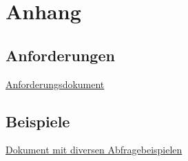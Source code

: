 \chapter*{Anhang}
\label{chap:anhang}


\appendix

\section*{Anforderungen}
\label{sec:anhang:anforderungen}
\href{anhang/anforderungen.pdf}{Anforderungsdokument}

\section*{Beispiele}
\label{sec:anhang:sparql_beispiele}
\href{anhang/schnipsel.pdf}{Dokument mit diversen Abfragebeispielen}
